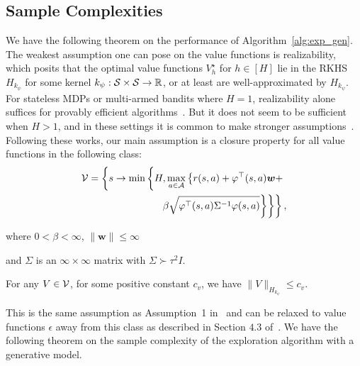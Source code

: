  
\subsection{Sample Complexities}

We have the following theorem on the performance of Algorithm~\ref{alg:exp_gen}. 
The weakest assumption one can pose on the value functions is realizability, which posits that the optimal value functions \(V^{\star}_{h}\) for \(h \in [H]\) lie in the RKHS \(H_{k_\psi}\) for some kernel $k_{\psi}:\mathcal{S}\times\mathcal{S}\rightarrow \mathbb{R}$, or at least are well-approximated by \(H_{k_\psi}\). For stateless MDPs or multi-armed bandits where \(H = 1\), realizability alone suffices for provably efficient algorithms~\citep{srinivas2009gaussian, chowdhury2017kernelized, vakili2021optimal}. But it does not seem to be sufficient when \(H > 1\), and in these settings it is common to make stronger assumptions~\citep{jin2020provably, wang2019optimism, chowdhury2023value}.
Following these works, our main assumption is a closure property for all value functions in the following class:
\begin{align}
    \mathcal{V} = \left\{
    s\rightarrow \min\left\{
    H, \max_{a\in\mathcal{A}}\left\{
    r(s,a) + \varphi^{\top}(s,a)\bm{w} + 
    \right. \right. \right. \nonumber \\
    \left. \left. \left. \beta \sqrt{\varphi^{\top}(s,a)\Sigma^{-1}\varphi(s,a)}
    \right\}
    \right\}
    \right\},
\end{align}

where $0<\beta<\infty$, $\|\bm{w}\|\le\infty$ 

and $\Sigma$ is an $\infty\times \infty$ matrix with $\Sigma \succ \tau^2 I$. 

\begin{assumption}\label{closure_assumption}
For any $V\in\mathcal{V}$, for some positive constant $c_v$, we have $\|V\|_{H_{k_\psi}}\leqslant c_v$.
\end{assumption}

This is the same assumption as Assumption~1 in~\cite{chowdhury2023value} and can be relaxed to value functions $\epsilon$ away from this class as described in Section $4.3$ of~\cite{chowdhury2023value}.
We have the following theorem on the sample complexity of the exploration algorithm with a generative model.


